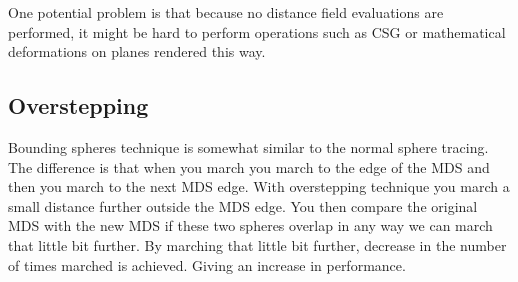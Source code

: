 			One potential problem is that because no distance field evaluations
			are performed, it might be hard to perform operations such as CSG
			or mathematical deformations on planes rendered this way.

		\subsection{Overstepping}

			Bounding spheres technique is somewhat similar to the normal sphere
			tracing. The difference is that when you march you march to the
			edge of the MDS and then you march to the next MDS edge. With
			overstepping technique you march a small distance further
			outside the MDS edge. You then compare the original MDS with the
			new MDS if these two spheres overlap in any way we can march that
			little bit further. By marching that little bit further, decrease
			in the number of times marched is achieved. Giving an increase in
			performance. 
			
